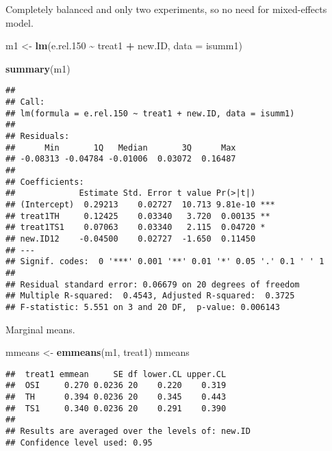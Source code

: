 \documentclass[
]{article}
\newenvironment{Shaded}{\begin{snugshade}}{\end{snugshade}}
\newcommand{\AttributeTok}[1]{\textcolor[rgb]{0.13,0.29,0.53}{#1}}
\newcommand{\FloatTok}[1]{\textcolor[rgb]{0.00,0.00,0.81}{#1}}
\newcommand{\FunctionTok}[1]{\textcolor[rgb]{0.13,0.29,0.53}{\textbf{#1}}}
\newcommand{\NormalTok}[1]{#1}
\newcommand{\OtherTok}[1]{\textcolor[rgb]{0.56,0.35,0.01}{#1}}
\newcommand{\SpecialCharTok}[1]{\textcolor[rgb]{0.81,0.36,0.00}{\textbf{#1}}}
\newcommand{\StringTok}[1]{\textcolor[rgb]{0.31,0.60,0.02}{#1}}
\begin{document}
Completely balanced and only two experiments, so no need for
mixed-effects model.

\begin{Shaded}
\begin{Highlighting}[]
\NormalTok{m1 }\OtherTok{\textless{}{-}} \FunctionTok{lm}\NormalTok{(e.rel}\FloatTok{.150} \SpecialCharTok{\textasciitilde{}}\NormalTok{ treat1 }\SpecialCharTok{+}\NormalTok{ new.ID, }\AttributeTok{data =}\NormalTok{ isumm1)}
\end{Highlighting}
\end{Shaded}

\begin{Shaded}
\begin{Highlighting}[]
\FunctionTok{summary}\NormalTok{(m1)}
\end{Highlighting}
\end{Shaded}

\begin{verbatim}
## 
## Call:
## lm(formula = e.rel.150 ~ treat1 + new.ID, data = isumm1)
## 
## Residuals:
##      Min       1Q   Median       3Q      Max 
## -0.08313 -0.04784 -0.01006  0.03072  0.16487 
## 
## Coefficients:
##             Estimate Std. Error t value Pr(>|t|)    
## (Intercept)  0.29213    0.02727  10.713 9.81e-10 ***
## treat1TH     0.12425    0.03340   3.720  0.00135 ** 
## treat1TS1    0.07063    0.03340   2.115  0.04720 *  
## new.ID12    -0.04500    0.02727  -1.650  0.11450    
## ---
## Signif. codes:  0 '***' 0.001 '**' 0.01 '*' 0.05 '.' 0.1 ' ' 1
## 
## Residual standard error: 0.06679 on 20 degrees of freedom
## Multiple R-squared:  0.4543, Adjusted R-squared:  0.3725 
## F-statistic: 5.551 on 3 and 20 DF,  p-value: 0.006143
\end{verbatim}

Marginal means.

\begin{Shaded}
\begin{Highlighting}[]
\NormalTok{mmeans }\OtherTok{\textless{}{-}} \FunctionTok{emmeans}\NormalTok{(m1, }\StringTok{\textquotesingle{}treat1\textquotesingle{}}\NormalTok{)}
\NormalTok{mmeans}
\end{Highlighting}
\end{Shaded}

\begin{verbatim}
##  treat1 emmean     SE df lower.CL upper.CL
##  OSI     0.270 0.0236 20    0.220    0.319
##  TH      0.394 0.0236 20    0.345    0.443
##  TS1     0.340 0.0236 20    0.291    0.390
## 
## Results are averaged over the levels of: new.ID 
## Confidence level used: 0.95
\end{verbatim}
\end{document}
